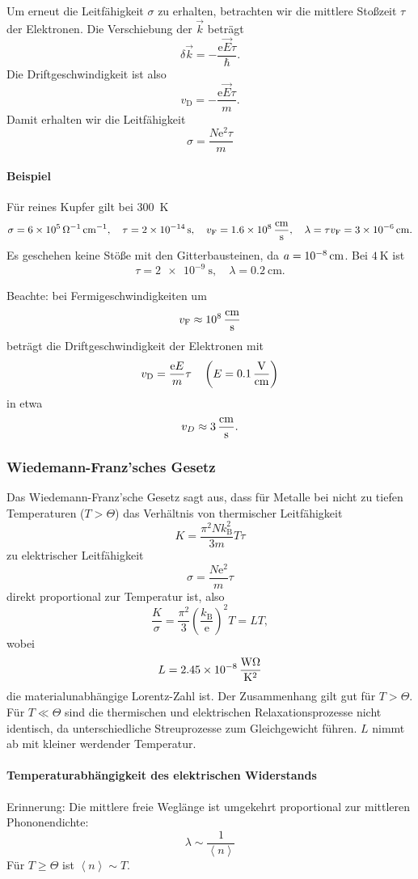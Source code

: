 	Um erneut die Leitfähigkeit $\sigma$ zu erhalten, betrachten wir die mittlere Stoßzeit $\tau$ der Elektronen. 
	Die Verschiebung der $\vec k$ beträgt 
	$$\delta \Vec{k} = - \frac{\mathrm{e}\Vec{E} \tau }{\hbar}.$$
	Die Driftgeschwindigkeit ist also
	$$v_{\mathrm{D}} = - \frac{\mathrm{e}\Vec{E} \tau }{m}.$$
	Damit erhalten wir die Leitfähigkeit
	$$\sigma = \frac{N \mathrm{e}^2 \tau }{m} $$

\paragraph{Beispiel} Für reines Kupfer gilt bei \SI{300}{\kelvin}
	$$
	\sigma = \SI{6 e 5}{\per\ohm\per\centi\meter}, \quad \tau = \SI{2 e-14}{\second}, \quad v_{\mathrm{F}} = \SI{1,6 e8}{ \frac{\centi \meter}{\second}}, \quad \lambda = \tau v_{\mathrm{F}} = \SI{3 e-6}{\centi \meter}.
	$$ 
	Es geschehen keine Stöße mit den Gitterbausteinen, da $a = \SI{e -8}{\centi \meter}$. Bei $\SI{4}{\kelvin}$ ist 
	$$\tau = \SI{2 e-9}{\second}, \quad\lambda = \SI{0,2}{\centi \meter}.$$

	Beachte: bei Fermigeschwindigkeiten um 
	$$v_{\mathrm{F}} \approx \SI{e 8}{ \frac{\centi \meter}{\second}}$$
	beträgt die Driftgeschwindigkeit der Elektronen mit
	$$v_{\mathrm{D}} = \frac{\mathrm{e}E}{m} \tau \quad \left(E = \SI{0,1}{ \frac{\volt}{\centi \meter}}\right)$$
	in etwa
	$$v_{D} \approx \SI{3}{ \frac{\centi \meter}{\second}}.$$

\subsubsection{Wiedemann-Franz'sches Gesetz}
	Das Wiedemann-Franz'sche Gesetz sagt aus, dass für Metalle bei nicht zu tiefen Temperaturen ($T>\Theta$) das Verhältnis von thermischer Leitfähigkeit
	$$K = \frac{\pi^2 N k_{\mathrm{B}}^2}{3m} T \tau$$
	zu elektrischer Leitfähigkeit
	$$\sigma = \frac{N\mathrm{e}^2}{m} \tau$$
	direkt proportional zur Temperatur ist, also
	$$
	\frac{K}{\sigma} = \frac{\pi^2}{3}\left( \frac{k_{\mathrm{B}}}{\mathrm{e}} \right) ^2 T = L T,
	$$ 
	wobei
	$$
	L = \SI{2,45 e-8}{ \frac{\watt \ohm}{\kelvin^2}}
	$$ 
	die materialunabhängige Lorentz-Zahl ist. 
	Der Zusammenhang gilt gut für $T> \Theta$.
	Für $T\ll\Theta$ sind die thermischen und elektrischen Relaxationsprozesse nicht identisch, da unterschiedliche Streuprozesse zum Gleichgewicht führen. 
	$L$ nimmt ab mit kleiner werdender Temperatur.

\paragraph{Temperaturabhängigkeit des elektrischen Widerstands}
	Erinnerung: Die mittlere freie Weglänge ist umgekehrt proportional zur mittleren Phononendichte:
	$$
	\lambda \sim \frac{1}{\left<n \right>}
	$$
	Für $T\ge \Theta$ ist $\left<n \right> \sim T$.

